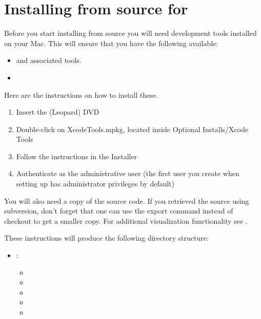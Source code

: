 %
%
%

\section{Installing from source for \macosx}
\label{sec:srcmac}

Before you start installing from source you will need \macosx development tools installed on your Mac.
This will ensure that you have the following available:
\begin{itemize}
\item {} and associated tools.
\item {}
\end{itemize}

Here are the instructions on how to install these.
\begin{enumerate}
\item Insert the  (Leopard) DVD
\item Double-click on XcodeTools.mpkg, located inside Optional Installs/Xcode Tools
\item Follow the instructions in the Installer
\item Authenticate as the administrative user (the first user you create when setting up \macosx has administrator privileges by default)
\end{enumerate}

You will also need a copy of the \esfinley source code.
If you retrieved the source using subversion, don't forget that one can use the export command instead of checkout to get a smaller copy.
For additional visualization functionality see .

These instructions will produce the following directory structure:
\begin{itemize}
 \item[] : \begin{itemize}
  \item[] 
  \item[] 
  \item[] 
  \item[] 
  \item[] 
 \end{itemize}
\end{itemize}

